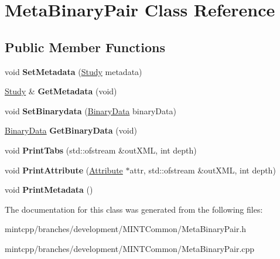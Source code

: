\hypertarget{class_meta_binary_pair}{
\section{MetaBinaryPair Class Reference}
\label{class_meta_binary_pair}
}
\subsection*{Public Member Functions}
\begin{DoxyCompactItemize}
\item 
\hypertarget{class_meta_binary_pair_a493a037ea533eafb8a1eb2dc9cfb8a2c}{
void {\bfseries SetMetadata} (\hyperlink{class_study}{Study} metadata)}
\label{class_meta_binary_pair_a493a037ea533eafb8a1eb2dc9cfb8a2c}

\item 
\hypertarget{class_meta_binary_pair_a449132d697c8210fc680856eb9d21552}{
\hyperlink{class_study}{Study} \& {\bfseries GetMetadata} (void)}
\label{class_meta_binary_pair_a449132d697c8210fc680856eb9d21552}

\item 
\hypertarget{class_meta_binary_pair_aa44234be91d1527bfb84cf7e14a36b9b}{
void {\bfseries SetBinarydata} (\hyperlink{class_binary_data}{BinaryData} binaryData)}
\label{class_meta_binary_pair_aa44234be91d1527bfb84cf7e14a36b9b}

\item 
\hypertarget{class_meta_binary_pair_a9300ef7709ac100d3e60860013f6015e}{
\hyperlink{class_binary_data}{BinaryData} {\bfseries GetBinaryData} (void)}
\label{class_meta_binary_pair_a9300ef7709ac100d3e60860013f6015e}

\item 
\hypertarget{class_meta_binary_pair_a6b16e8a64952b694f50fa415a6fb154e}{
void {\bfseries PrintTabs} (std::ofstream \&outXML, int depth)}
\label{class_meta_binary_pair_a6b16e8a64952b694f50fa415a6fb154e}

\item 
\hypertarget{class_meta_binary_pair_a23254105dd2381b656a517105273b79c}{
void {\bfseries PrintAttribute} (\hyperlink{class_attribute}{Attribute} $\ast$attr, std::ofstream \&outXML, int depth)}
\label{class_meta_binary_pair_a23254105dd2381b656a517105273b79c}

\item 
\hypertarget{class_meta_binary_pair_a151951f7b6f092cb5dbc498c9200b017}{
void {\bfseries PrintMetadata} ()}
\label{class_meta_binary_pair_a151951f7b6f092cb5dbc498c9200b017}

\end{DoxyCompactItemize}


The documentation for this class was generated from the following files:\begin{DoxyCompactItemize}
\item 
mintcpp/branches/development/MINTCommon/MetaBinaryPair.h\item 
mintcpp/branches/development/MINTCommon/MetaBinaryPair.cpp\end{DoxyCompactItemize}
